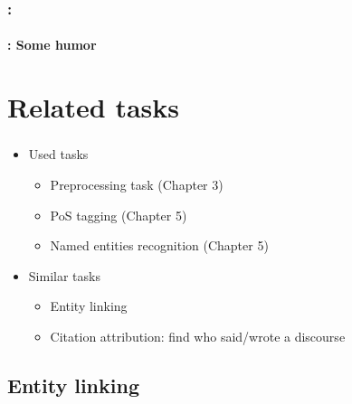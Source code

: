 \documentclass[xcolor=table]{beamer}
\begin{document}
\begin{frame}
	\frametitle{\insertshortsubtitle: \insertsection}
	\framesubtitle{\insertsubsection: Some humor}
	
	\begin{center}
	\end{center}
	
\end{frame}

\section{Related tasks}

\begin{frame}
	\frametitle{\insertshortsubtitle}
	\framesubtitle{\insertsection}
	
	\begin{itemize}
		\item Used tasks
		\begin{itemize}
			\item Preprocessing task (Chapter 3)
			\item PoS tagging (Chapter 5)
			\item Named entities recognition (Chapter 5)
		\end{itemize}
		\item Similar tasks
		\begin{itemize}
			\item Entity linking
			\item Citation attribution: find who said/wrote a discourse
		\end{itemize}
	\end{itemize}
	
\end{frame}

\subsection{Entity linking}
\end{document}
